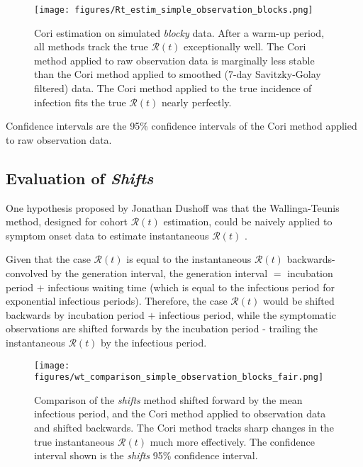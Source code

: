 \documentclass{article}
\newcommand{\nR}{\mathcal{R}}
\begin{document}
\clearpage

\begin{figure}[h!]
\centering
\texttt{[image: figures/Rt\_estim\_simple\_observation\_blocks.png]}
\caption{Cori estimation on simulated \emph{blocky} data. After a warm-up period, all methods track the true $\nR(t)$ exceptionally well. The Cori method applied to raw observation data is marginally less stable than the Cori method applied to smoothed (7-day Savitzky-Golay filtered) data. The Cori method applied to the true incidence of infection fits the true $\nR(t)$ nearly perfectly.} 
\end{figure}

Confidence intervals are the 95\% confidence intervals of the Cori method applied to raw observation data. 

\subsection{Evaluation of \emph{Shifts}}
One hypothesis proposed by Jonathan Dushoff was that the Wallinga-Teunis method, designed for cohort $\nR(t)$ estimation, could be naively applied to symptom onset data to estimate instantaneous $\nR(t)$ \cite{shifts}. 

Given that the case $\nR(t)$ is equal to the instantaneous $\nR(t)$ backwards-convolved by the generation interval, the generation interval $=$ incubation period $+$ infectious waiting time (which is equal to the infectious period for exponential infectious periods). Therefore, the case $\nR(t)$ would be shifted backwards by incubation period $+$ infectious period, while the symptomatic observations are shifted forwards by the incubation period - trailing the instantaneous $\nR(t)$ by the infectious period.

\clearpage
\begin{figure}[h!]
\centering
\texttt{[image: figures/wt\_comparison\_simple\_observation\_blocks\_fair.png]}
\caption{Comparison of the \emph{shifts} method shifted forward by the mean infectious period, and the Cori method applied to observation data and shifted backwards. The Cori method tracks sharp changes in the true instantaneous $\nR(t)$ much more effectively. The confidence interval shown is the \emph{shifts} 95\% confidence interval.} 
\end{figure}
\end{document}
